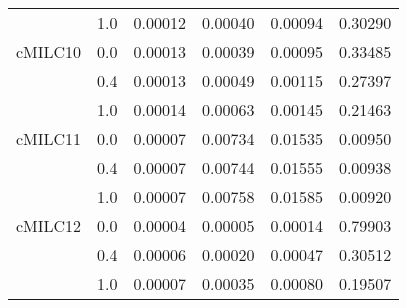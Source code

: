 \begin{longtable}{cccccc}
     & 1.0 & 0.00012 & 0.00040 & 0.00094 & 0.30290 \\
cMILC10 & 0.0 & 0.00013 & 0.00039 & 0.00095 & 0.33485 \\
     & 0.4 & 0.00013 & 0.00049 & 0.00115 & 0.27397 \\
     & 1.0 & 0.00014 & 0.00063 & 0.00145 & 0.21463 \\
cMILC11 & 0.0 & 0.00007 & 0.00734 & 0.01535 & 0.00950 \\
     & 0.4 & 0.00007 & 0.00744 & 0.01555 & 0.00938 \\
     & 1.0 & 0.00007 & 0.00758 & 0.01585 & 0.00920 \\
cMILC12 & 0.0 & 0.00004 & 0.00005 & 0.00014 & 0.79903 \\
     & 0.4 & 0.00006 & 0.00020 & 0.00047 & 0.30512 \\
     & 1.0 & 0.00007 & 0.00035 & 0.00080 & 0.19507 \\
\end{longtable}

